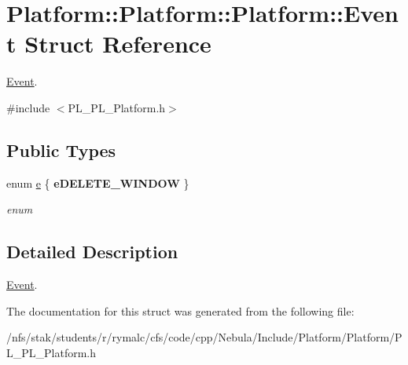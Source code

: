 \hypertarget{structPlatform_1_1Platform_1_1Platform_1_1Event}{
\section{Platform::Platform::Platform::Event Struct Reference}
\label{structPlatform_1_1Platform_1_1Platform_1_1Event}
}


\hyperlink{structPlatform_1_1Platform_1_1Platform_1_1Event}{Event}.  


{\ttfamily \#include $<$PL\_\-PL\_\-Platform.h$>$}\subsection*{Public Types}
\begin{DoxyCompactItemize}
\item 
enum \hyperlink{structPlatform_1_1Platform_1_1Platform_1_1Event_aa68ceadf0be1395a8705cfbae099315d}{e} \{ {\bfseries eDELETE\_\-WINDOW}
 \}
\begin{DoxyCompactList}\small\item\em enum \item\end{DoxyCompactList}\end{DoxyCompactItemize}


\subsection{Detailed Description}
\hyperlink{structPlatform_1_1Platform_1_1Platform_1_1Event}{Event}. 

The documentation for this struct was generated from the following file:\begin{DoxyCompactItemize}
\item 
/nfs/stak/students/r/rymalc/cfs/code/cpp/Nebula/Include/Platform/Platform/PL\_\-PL\_\-Platform.h\end{DoxyCompactItemize}
